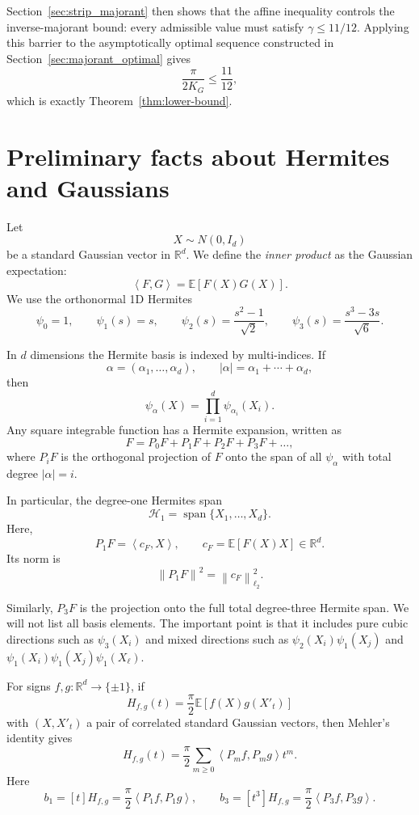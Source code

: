 \documentclass[11pt]{article}
\numberwithin{equation}{section}
\newcommand{\R}{\mathbb R}
\newcommand{\E}{\mathbb E}
\newcommand{\ip}[2]{\left\langle #1,#2\right\rangle}
\newcommand{\norm}[1]{\left\|#1\right\|}
\newcommand{\cH}{\mathcal H}
\begin{document}
Section~\ref{sec:strip_majorant} then shows that the affine inequality controls the inverse-majorant bound: every admissible value must satisfy $\gamma\le11/12$. Applying this barrier to the asymptotically optimal sequence constructed in Section~\ref{sec:majorant_optimal} gives
\[
        \frac{\pi}{2K_G}\le\frac{11}{12},
\]
which is exactly Theorem~\ref{thm:lower-bound}.

\section{Preliminary facts about Hermites and Gaussians}
\label{sec:preliminaries}

Let
\[
        X\sim N(0,I_d)
\]
be a standard Gaussian vector in $\R^d$. We define the \textit{inner product} as the Gaussian expectation:
\[
        \ip{F}{G}=\E[F(X)G(X)].
\]
We use the orthonormal 1D Hermites
\[
        \psi_0=1,\qquad
        \psi_1(s)=s,\qquad
        \psi_2(s)=\frac{s^2-1}{\sqrt2},\qquad
        \psi_3(s)=\frac{s^3-3s}{\sqrt6}.
\]

In $d$ dimensions the Hermite basis is indexed by multi-indices. If
\[
        \alpha=(\alpha_1,\ldots,\alpha_d),
        \qquad |\alpha|=\alpha_1+\cdots+\alpha_d,
\]
then
\[
        \psi_\alpha(X)=\prod_{i=1}^d \psi_{\alpha_i}(X_i).
\]
Any square integrable function has a Hermite expansion, written as
\[
        F=P_0F+P_1F+P_2F+P_3F+\ldots,
\]
where $P_iF$ is the orthogonal projection of $F$ onto the span of all $\psi_\alpha$ with total degree $|\alpha|=i$.

In particular, the degree-one Hermites span
\[
        \cH_1=\operatorname{span}\{X_1,\ldots,X_d\}.
\]
Here,
\[
        P_1F=\ip{c_F}{X},
        \qquad
        c_F=\E[F(X)X]\in\R^d.
\]
Its norm is
\[
        \norm{P_1F}^2=\norm{c_F}_{\ell_2}^2.
\]

Similarly, $P_3F$ is the projection onto the full total degree-three Hermite span. We will not list all basis elements. The important point is that it includes pure cubic directions such as $\psi_3(X_i)$ and mixed directions such as $\psi_2(X_i)\psi_1(X_j)$ and $\psi_1(X_i)\psi_1(X_j)\psi_1(X_\ell)$.

For signs $f,g:\R^d\to\{\pm1\}$, if
\[
        H_{f,g}(t)=\frac\pi2\E[f(X)g(X'_t)]
\]
with $(X,X'_t)$ a pair of correlated standard Gaussian vectors, then Mehler's identity gives
\[
        H_{f,g}(t)=\frac\pi2\sum_{m\ge0}\ip{P_mf}{P_mg}t^m.
\]
Here
\[
        b_1=[t]H_{f,g}=\frac\pi2\ip{P_1f}{P_1g},
        \qquad
        b_3=[t^3]H_{f,g}=\frac\pi2\ip{P_3f}{P_3g}.
\]
\end{document}
